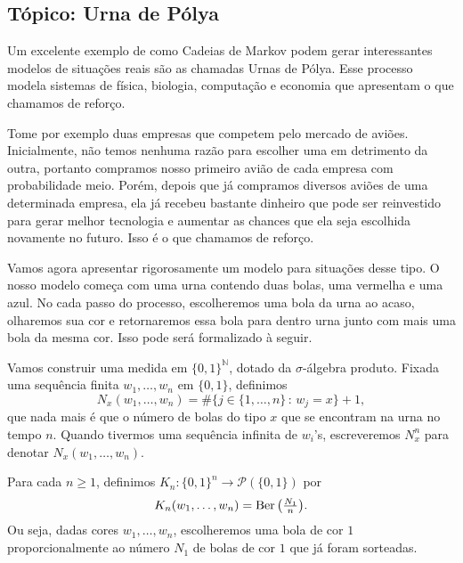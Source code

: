 \begin{topics}

\section{Tópico: Urna de Pólya}
\label{s:urna_polya}

Um excelente exemplo de como Cadeias de Markov podem gerar interessantes modelos de situações reais são as chamadas Urnas de Pólya.
Esse processo modela sistemas de física, biologia, computação e economia que apresentam o que chamamos de reforço.

Tome por exemplo duas empresas que competem pelo mercado de aviões.
Inicialmente, não temos nenhuma razão para escolher uma em detrimento da outra, portanto compramos nosso primeiro avião de cada empresa com probabilidade meio.
Porém, depois que já compramos diversos aviões de uma determinada empresa, ela já recebeu bastante dinheiro que pode ser reinvestido para gerar melhor tecnologia e aumentar as chances que ela seja escolhida novamente no futuro.
Isso é o que chamamos de reforço.

Vamos agora apresentar rigorosamente um modelo para situações desse tipo.
O nosso modelo começa com uma urna contendo duas bolas, uma vermelha e uma azul.
No cada passo do processo, escolheremos uma bola da urna ao acaso, olharemos sua cor e retornaremos essa bola para dentro urna junto com mais uma bola da mesma cor.
Isso pode será formalizado à seguir.

Vamos construir uma medida em $\{0, 1\}^\mathbb{N}$, dotado da $\sigma$-álgebra produto.
Fixada uma sequência finita $w_1, \dots, w_n$ em $\{0,1\}$, definimos
\begin{equation}
  N_x (w_1, \dots, w_n) = \# \big\{ j \in \{1, \dots, n\}\, : \, w_j = x \big\} + 1,
\end{equation}
que nada mais é que o número de bolas do tipo $x$ que se encontram na urna no tempo $n$.
Quando tivermos uma sequência infinita de $w_i$'s, escreveremos $N^n_x$ para denotar $N_x(w_1, \dots, w_n)$.

Para cada $n \geq 1$, definimos $K_n:\{0,1\}^n \to \mathcal{P}(\{0,1\})$ por
\begin{equation}
  K_n(w_1, \dots, w_n) = \operatorname{Ber}\big( \tfrac{N_1}{n} \big).
\end{equation}
Ou seja, dadas cores $w_1, \dots, w_n$, escolheremos uma bola de cor $1$ proporcionalmente ao número $N_1$ de bolas de cor $1$ que já foram sorteadas.


\end{topics}
